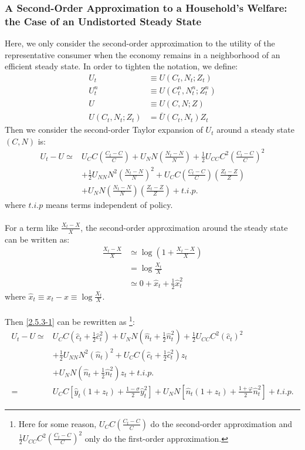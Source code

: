 \documentclass{article}
\numberwithin{equation}{section}
\begin{document}
\subsubsection{A Second-Order Approximation to a Household's Welfare: the Case of an Undistorted Steady State}
Here, we only consider the second-order approximation to the utility of the representative consumer when the economy remains in a neighborhood of an efficient steady state. In order to tighten the notation, we define:
	\begin{align*}
		U_t &\equiv U(C_t, N_t; Z_t)\\
		U^n_t &\equiv U(C^n_t, N^n_t; Z^n_t)\\
		U &\equiv U(C, N; Z)\\
		U(C_t, N_t; Z_t) &= \bar{U}(C_t, N_t)Z_t
	\end{align*}
Then we consider the second-order Taylor expansion of $U_t$ around a steady state $(C, N)$ is:
	\begin{align}
		U_t - U \simeq &U_C C \left( \frac{C_t - C}{C} \right) + U_N N \left( \frac{N_t - N}{N} \right) + \frac{1}{2} U_{CC} C^2 \left( \frac{C_t - C}{C} \right)^2 \nonumber\\
		&+ \frac{1}{2} U_{NN} N^2 \left( \frac{N_t - N}{N} \right)^2 + U_C C \left( \frac{C_t - C}{C} \right) \left( \frac{Z_t - Z}{Z} \right) \nonumber\\
		&+ U_N N \left( \frac{N_t - N}{N} \right) \left( \frac{Z_t - Z}{Z} \right) + t.i.p. \label{2.5.3-1}
	\end{align} 
where $t.i.p$ means terms independent of policy.\\\\
For a term like $\frac{X_t - X}{X}$, the second-order approximation around the steady state can be written as:
	\begin{align*}
		\frac{X_t - X}{X} &\simeq \log\left( 1 + \frac{X_t - X}{X} \right)\\
		& = \log\frac{X_t}{X}\\
		&\simeq 0 + \hat{x}_t + \frac{1}{2}\hat{x}^2_t
	\end{align*}
where $\hat{x}_t \equiv x_t - x \equiv \log\frac{X_t}{X}$.\\\\
Then \eqref{2.5.3-1} can be rewritten as
\footnote{Here for some reason, $U_C C \left( \frac{C_t - C}{C} \right)$ do the second-order approximation and $\frac{1}{2} U_{CC} C^2 \left( \frac{C_t - C}{C} \right)^2$ only do the first-order approximation.}:
	\begin{align}
		U_t - U \simeq &U_C C \left( \hat{c}_t + \frac{1}{2}\hat{c}^2_t \right) + U_N N \left( \hat{n}_t + \frac{1}{2}\hat{n}^2_t \right) + \frac{1}{2} U_{CC} C^2 \left( \hat{c}_t \right)^2 \nonumber\\
		&+ \frac{1}{2} U_{NN} N^2 \left( \hat{n}_t \right)^2 + U_C C \left( \hat{c}_t + \frac{1}{2}\hat{c}^2_t \right) z_t \nonumber\\
		&+ U_N N \left( \hat{n}_t + \frac{1}{2}\hat{n}^2_t \right) z_t + t.i.p. \nonumber\\
		= &U_C C \left[ \hat{y}_t (1 + z_t) + \frac{1 - \sigma}{2} \hat{y}^2_t \right] + U_N N \left[ \hat{n}_t (1 + z_t) + \frac{1 + \varphi}{2} \hat{n}^2_t \right] + t.i.p. \label{2.5.3-2}
	\end{align}
\end{document}
